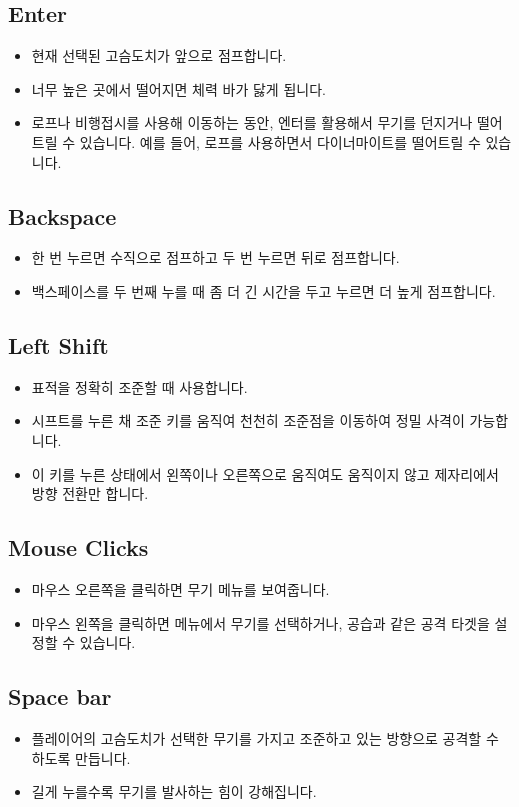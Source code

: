 \documentclass{report}
\begin{document}
\begin{flushleft}
    \subsection{Enter}
    \begin{itemize}
        \item 현재 선택된 고슴도치가 앞으로 점프합니다. 
        \item 너무 높은 곳에서 떨어지면 체력 바가 닳게 됩니다.
        \item 로프나 비행접시를 사용해 이동하는 동안, 엔터를 활용해서 무기를 던지거나 떨어트릴 수 있습니다. 예를 들어, 로프를 사용하면서 다이너마이트를 떨어트릴 수 있습니다.
    \end{itemize}
    \subsection{Backspace}
    \begin{itemize}
        \item 한 번 누르면 수직으로 점프하고
 두 번 누르면 뒤로 점프합니다. 
        \item 백스페이스를 두 번째 누를 때 좀 더 긴 시간을 두고 누르면 더 높게 점프합니다.
    \end{itemize}
    \subsection{Left Shift}
    \begin{itemize}
        \item 표적을 정확히 조준할 때 사용합니다. 
        \item 시프트를 누른 채 조준 키를 움직여 천천히 조준점을 이동하여 정밀 사격이 가능합니다.
        \item  이 키를 누른 상태에서 왼쪽이나 오른쪽으로 움직여도 움직이지 않고 제자리에서 방향 전환만 합니다.
    \end{itemize}
    \subsection{Mouse Clicks}
    \begin{itemize}
        \item 마우스 오른쪽을 클릭하면 무기 메뉴를 보여줍니다.
        \item 마우스 왼쪽을 클릭하면 메뉴에서 무기를 선택하거나, 공습과 같은 공격 타겟을 설정할 수 있습니다.
    \end{itemize}
    \subsection{Space bar}
    \begin{itemize}
        \item 플레이어의 고슴도치가 선택한 무기를 가지고 조준하고 있는 방향으로 공격할 수 하도록 만듭니다.
        \item 길게 누를수록 무기를 발사하는 힘이 강해집니다.
    \end{itemize}
    

\end{flushleft}
\end{document}
